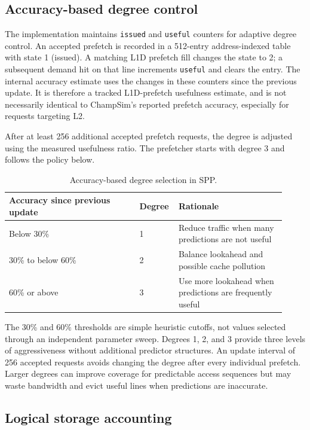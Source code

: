 \subsection{Accuracy-based degree control}

The implementation maintains \texttt{issued} and \texttt{useful} counters for adaptive degree control. An accepted prefetch is recorded in a 512-entry address-indexed table with state 1 (issued). A matching L1D prefetch fill changes the state to 2; a subsequent demand hit on that line increments \texttt{useful} and clears the entry. The internal accuracy estimate uses the changes in these counters since the previous update. It is therefore a tracked L1D-prefetch usefulness estimate, and is not necessarily identical to ChampSim's reported prefetch accuracy, especially for requests targeting L2.

After at least 256 additional accepted prefetch requests, the degree is adjusted using the measured usefulness ratio. The prefetcher starts with degree 3 and follows the policy below.

\begin{table}[H]\centering\small
\caption{Accuracy-based degree selection in SPP.}
\begin{tabular}{p{0.45\linewidth}p{0.10\linewidth}p{0.37\linewidth}}
\toprule Accuracy since previous update & Degree & Rationale \\
\midrule
Below 30\% & 1 & Reduce traffic when many predictions are not useful \\
30\% to below 60\% & 2 & Balance lookahead and possible cache pollution \\
60\% or above & 3 & Use more lookahead when predictions are frequently useful \\
\bottomrule
\end{tabular}
\end{table}

The 30\% and 60\% thresholds are simple heuristic cutoffs, not values selected through an independent parameter sweep. Degrees 1, 2, and 3 provide three levels of aggressiveness without additional predictor structures. An update interval of 256 accepted requests avoids changing the degree after every individual prefetch. Larger degrees can improve coverage for predictable access sequences but may waste bandwidth and evict useful lines when predictions are inaccurate.

\subsection{Logical storage accounting}

